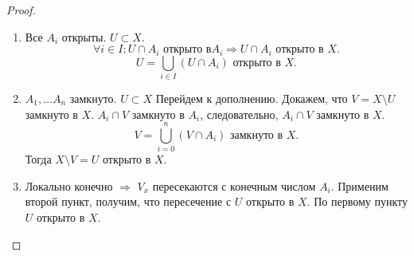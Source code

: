 \documentclass[11pt]{book}
\theoremstyle{definition}
\theoremstyle{plain}
\theoremstyle{plain}
\theoremstyle{definition}
\theoremstyle{remark}
\begin{document}
\begin{proof}
    $ $
    \begin{enumerate}
        \item Все  $ A_i$ открыты. $ U \subset X$.
	    \[
	    \forall  i \in I: U \cap A_i \text{ открыто в} A_i \Longrightarrow U \cap A_i \text{ открыто в } X
	    .\] 
	    \[
		U = \bigcup_{i \in  I} (U \cap A_i) \text{ открыто в }X
	    .\] 
	\item $ A_1, \ldots A_n$ замкнуто. $ U \subset X$
Перейдем к дополнению. Докажем, что $ V = X \setminus U$ замкнуто в $ X$.  $ A_i \cap V $ замкнуто в $ A_i$, следовательно, $ A_i \cap V$ замкнуто в $ X$. 
\[
    V = \bigcup_{i=0} ^{n}(V \cap A_i) \text{ замкнуто в } X
.\] 
Тогда $ X \setminus V = U $ открыто в $ X$.
\item Локально конечно  $ \Longrightarrow $ $ V_x$ пересекаются с конечным числом  $ A_i$. Применим второй пункт, получим, что пересечение с  $ U$ открыто в  $ X$.
    По первому пункту  $ U$ открыто в  $ X$.
    \end{enumerate}
\end{proof}
\end{document}
